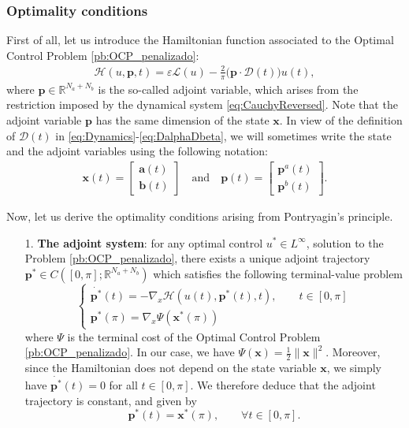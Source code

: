\documentclass[twocolumn]{autart}    %
\begin{document}
\begin{remark}
\subsubsection{Optimality conditions}

First of all, let us introduce the Hamiltonian function associated to the Optimal Control Problem \ref{pb:OCP_penalizado}:
\begin{align}\label{eq:hamil}
    \mathcal{H}(u,\bm{p},t) = \varepsilon \mathcal{L}(u) - \frac 2\pi\big(\bm{p} \cdot \bm{\mathcal{D}}(t)\big)u(t),
\end{align}
where $\bm{p}\in \mathbb{R}^{N_a+N_b}$ is the so-called adjoint variable, which arises from the restriction imposed by the dynamical system \eqref{eq:CauchyReversed}. Note that the adjoint variable $\bm{p}$ has the same dimension of the state $\bm{x}$. In view of the definition of $\bm{\mathcal{D}}(t)$ in \eqref{eq:Dynamics}-\eqref{eq:DalphaDbeta}, we will sometimes write the state and the adjoint variables using the following notation:
\begin{align*}
  \bm{x}(t) = \begin{bmatrix} \bm{a}(t) \\ \bm{b}(t) \end{bmatrix} \quad \text{and}\quad
  \bm{p}(t) = \begin{bmatrix} \bm{p}^a(t) \\ \bm{p}^b(t) \end{bmatrix}.
\end{align*}

Now, let us derive the optimality conditions arising from Pontryagin's principle.
\begin{itemize}
	\item[1.] \textbf{The adjoint system}: for any optimal control $u^\ast \in L^\infty$, solution to the Problem \ref{pb:OCP_penalizado}, there exists a unique adjoint trajectory $\bm{p}^\ast\in C([0,\pi]; \mathbb{R}^{N_a+N_b})$ which satisfies the following terminal-value problem
    \begin{equation*}
    	\begin{cases}
    		\dot{\bm{p}^\ast}(t) = -\nabla_x \mathcal{H}(u(t),\bm{p}^\ast(t),t), \qquad t \in [0,\pi] 
    		\\[5pt]
    		\bm{p}^\ast (\pi) = \nabla_x \Psi (\bm{x}^\ast (\pi))
    	\end{cases}
    \end{equation*}
    where $\Psi$ is the terminal cost of the Optimal Control Problem \ref{pb:OCP_penalizado}. In our case, we have $\Psi (\bm{x}) = \frac{1}{2} \| \bm{x}\|^2$. Moreover, since the Hamiltonian does not depend on the state variable $\bm{x}$, we simply have $\dot{\bm{p}^\ast}(t) = 0$ for all $t \in [0,\pi]$. We therefore deduce that the adjoint trajectory is constant, and given by
    \begin{equation}\label{eq:adjoint constant}
		\bm{p}^\ast (t) = \bm{x}^\ast (\pi), \qquad \forall t \in [0,\pi]. 
	\end{equation}
    

\end{itemize}
\end{remark}
\end{document}
